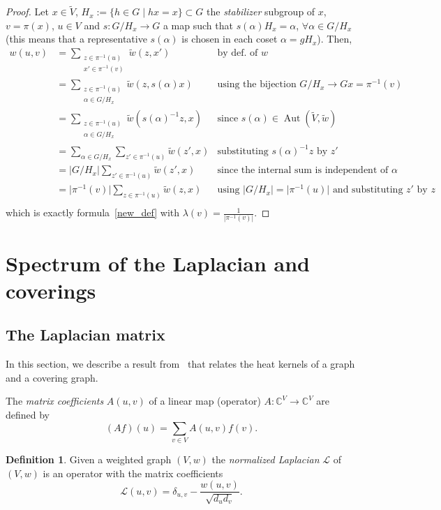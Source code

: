 \documentclass[11pt]{amsart}
\newcommand{\C}{\mathbb{C}}
\theoremstyle{definition}
\newtheorem{definition}{Definition}
\theoremstyle{remark}
\theoremstyle{plain}
\numberwithin{equation}{section}
\numberwithin{lemma}{section}
\numberwithin{definition}{section}
\numberwithin{proposition}{section}
\numberwithin{corollary}{section}
\numberwithin{theorem}{section}
\numberwithin{remark}{section}
\begin{document}
\begin{proof}
 Let $x\in\tilde{V}$, $H_x:=\{h\in G\mid hx=x\}\subset G$ the \textit{stabilizer} subgroup of $x$, $v=\pi(x)$, $u\in V$ and $s\colon G/H_x\to G$ a map such that $s(\alpha)H_x=\alpha$, $\forall\alpha\in G/H_x$ (this means that a representative $s(\alpha)$ is chosen in each coset $\alpha=gH_x$).
 Then,
\begin{align*}
    w(u,v) & =\sum_{\substack{z\in \pi^{-1}(u)\\ x'\in \pi^{-1}(v)}}\tilde{w}(z,x') & \text{by def. of $w$}  \\
    & =\sum_{\substack{z\in \pi^{-1}(u) \\ \alpha\in G/H_x}}\tilde{w}(z,s(\alpha)x) & \text{using the bijection $G/H_x\to Gx=\pi^{-1}(v)$} \\
    & = \sum_{\substack{z\in \pi^{-1}(u) \\ \alpha\in G/H_x}} \tilde{w}({s(\alpha)}^{-1}z,x) & \text{since $s(\alpha)\in \operatorname{Aut}(\tilde{V},\tilde{w})$ } \\
    & =\sum_{\alpha\in G/H_x}\sum_{z'\in \pi^{-1}(u)}\tilde{w}(z',x) & \text{substituting $s(\alpha)^{-1}z$ by $z'$} \\ 
    & =\vert G/H_x\vert \sum_{z'\in \pi^{-1}(u)}\tilde{w}(z',x) & \text{since the internal sum is independent of $\alpha$} \\
    & =\vert \pi^{-1}(v)\vert\sum_{z\in \pi^{-1}(u)}\tilde{w}(z,x) & \text{using $\vert G/H_x\vert=\vert \pi^{-1}(u) \vert$ and substituting $z'$ by $z$}\\ 
\end{align*}
 which is exactly formula~\eqref{new_def} with $\lambda(v)=\frac{1}{|\pi^{-1}(v)|}$.
\end{proof}

\section{Spectrum of the Laplacian and coverings}
\subsection{The Laplacian matrix}
In this section, we describe a result from~\cite{MR1667452} that relates the heat kernels of a graph and a covering graph.

The \emph{matrix coefficients} $A(u,v)$ of a linear map (operator) $A\colon \C^V \to \C^V$ are defined by 
$$
(Af)(u)=\sum_{v\in V}A(u,v)f(v).
$$

\begin{definition} 
 Given a weighted graph $(V,w)$ the \textit{normalized Laplacian} $\mathcal{L}$ of $(V,w)$ is an operator with the matrix coefficients  
\begin{equation}\label{normLaplacian}
  \mathcal{L}(u,v)=\delta_{u,v}-\frac{w(u,v)}{\sqrt{d_ud_v}}.
\end{equation}
 \end{definition}
 
\end{document}
